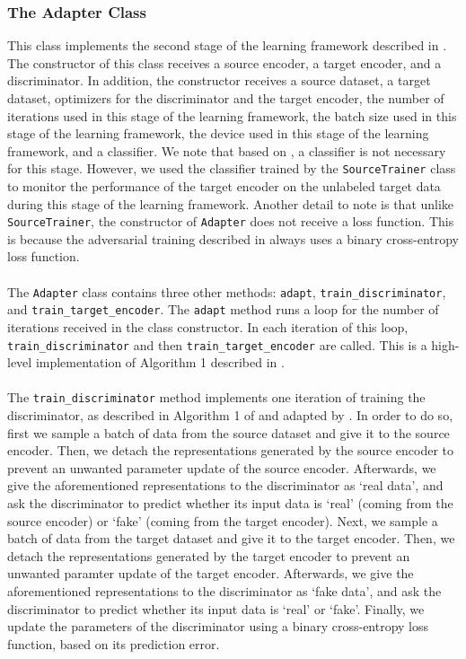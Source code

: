 \documentclass[14pt]{extarticle}
\begin{document}
		\subsubsection{The Adapter Class}
		This class implements the second stage of the learning framework described in \cite{adda}. The constructor of this class receives a source encoder, a target encoder, and a discriminator. In addition, the constructor receives a source dataset, a target dataset, optimizers for the discriminator and the target encoder, the number of iterations used in this stage of the learning framework, the batch size used in this stage of the learning framework, the device used in this stage of the learning framework, and a classifier. We note that based on \cite{adda}, a classifier is not necessary for this stage. However, we used the classifier trained by the \texttt{SourceTrainer} class to monitor the performance of the target encoder on the unlabeled target data during this stage of the learning framework. Another detail to note is that unlike \texttt{SourceTrainer}, the constructor of \texttt{Adapter} does not receive a loss function. This is because the adversarial training described in \cite{adda} always uses a binary cross-entropy loss function.\\\\
		The \texttt{Adapter} class contains three other methods: \texttt{adapt}, \texttt{train\_discriminator}, and \texttt{train\_target\_encoder}. The \texttt{adapt} method runs a loop for the number of iterations received in the class constructor. In each iteration of this loop, \texttt{train\_discriminator} and then \texttt{train\_target\_encoder} are called. This is a high-level implementation of Algorithm 1 described in \cite{gan}.\\\\
		The \texttt{train\_discriminator} method implements one iteration of training the discriminator, as described in Algorithm 1 of \cite{gan} and adapted by \cite{adda}. In order to do so, first we sample a batch of data from the source dataset and give it to the source encoder. Then, we detach the representations generated by the source encoder to prevent an unwanted parameter update of the source encoder. Afterwards, we give the aforementioned representations to the discriminator as `real data', and ask the discriminator to predict whether its input data is `real' (coming from the source encoder) or `fake' (coming from the target encoder). Next, we sample a batch of data from the target dataset and give it to the target encoder. Then, we detach the representations generated by the target encoder to prevent an unwanted paramter update of the target encoder. Afterwards, we give the aforementioned representations to the discriminator as `fake data', and ask the discriminator to predict whether its input data is `real' or `fake'. Finally, we update the parameters of the discriminator using a binary cross-entropy loss function, based on its prediction error.\\\\
\end{document}
